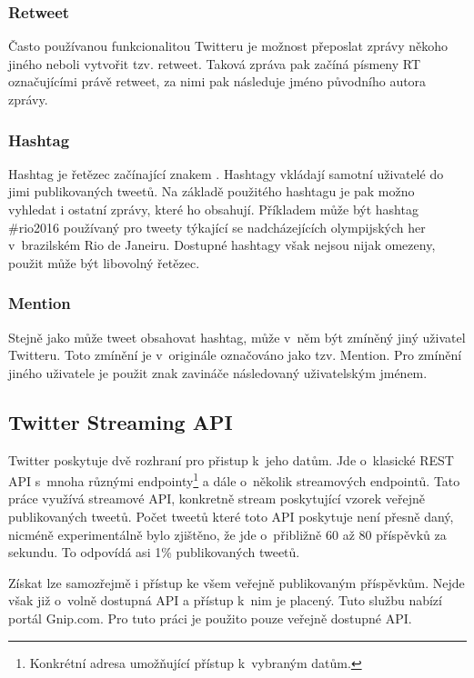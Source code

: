 \documentclass[thesis=B,czech]{FITthesis}[2012/06/26]
\begin{document}
\subsubsection{Retweet}

	Často používanou funkcionalitou Twitteru je možnost přeposlat zprávy někoho jiného neboli vytvořit tzv. retweet. Taková zpráva pak začíná písmeny RT označujícími právě retweet, za nimi pak následuje jméno původního autora zprávy. 


\subsubsection{Hashtag}

	Hashtag je řetězec začínající znakem \uv{\#}. Hashtagy vkládají samotní uživatelé do jimi publikovaných tweetů. Na základě použitého hashtagu je pak možno vyhledat i ostatní zprávy, které ho obsahují. Příkladem může být hashtag \#rio2016 používaný pro tweety týkající se nadcházejících olympijských her v~brazilském Rio de Janeiru. Dostupné hashtagy však nejsou nijak omezeny, použit může být libovolný řetězec. 


\subsubsection{Mention}

	Stejně jako může tweet obsahovat hashtag, může v~něm být zmíněný jiný uživatel Twitteru. Toto zmínění je v~originále označováno jako tzv. Mention. Pro zmínění jiného uživatele je použit znak zavináče následovaný uživatelským jménem. 


\subsection{Twitter Streaming API}
\label{twitter-api}
	Twitter poskytuje dvě rozhraní pro přistup k~jeho datům. Jde o~klasické REST API s~mnoha různými endpointy\footnote{Konkrétní adresa umožňující přístup k~vybraným datům.} a dále o~několik streamových endpointů. Tato práce využívá streamové API, konkretně stream poskytující vzorek veřejně publikovaných tweetů\cite{twitter-api}. Počet tweetů které toto API poskytuje není přesně daný, nicméně experimentálně bylo zjištěno, že jde o~přibližně 60 až 80 příspěvků za sekundu. To odpovídá asi 1\% publikovaných tweetů. 
	
	Získat lze samozřejmě i přístup ke všem veřejně publikovaným příspěvkům. Nejde však již o~volně dostupná API a přístup k~nim je placený. Tuto službu nabízí portál Gnip.com\cite{gnip}. Pro tuto práci je použito pouze veřejně dostupné API. 
	
\end{document}
